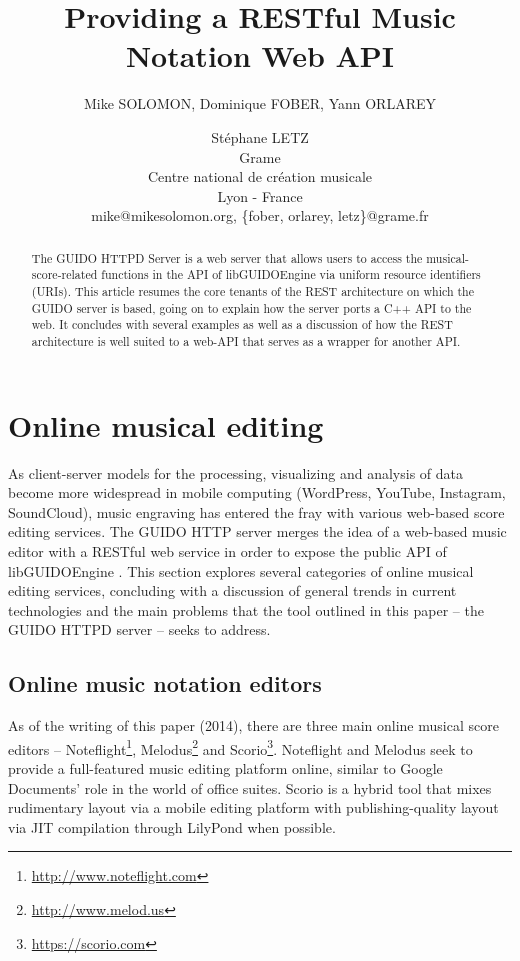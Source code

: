 \documentclass[11pt,a4paper]{article}
\title{Providing a RESTful Music Notation Web API}
\author
{Mike SOLOMON, Dominique FOBER, Yann ORLAREY \and Stéphane LETZ
\\ Grame
\\ Centre national de création musicale
\\ Lyon - France 
\\ mike@mikesolomon.org, \{fober, orlarey, letz\}@grame.fr 
}
\date{}
\newcommand{\footurl}[1]	{\footnote{\url{#1}}}
\begin{document}
\maketitle

\begin{abstract}

The GUIDO HTTPD Server is a web server that allows users to access the musical-score-related functions in the API of libGUIDOEngine via uniform resource identifiers (URIs).  This article resumes the core tenants of the REST architecture on which the GUIDO server is based, going on to explain how the server ports a C++ API to the web.  It concludes with several examples as well as a discussion of how the REST architecture is well suited to a web-API that serves as a wrapper for another API.
\end{abstract}


\section{Online musical editing}\label{section:online-musical-editing}
As client-server models for the processing, visualizing and analysis of data become more widespread in mobile computing (WordPress, YouTube, Instagram, SoundCloud), music engraving has entered the fray with various web-based score editing services.  The GUIDO HTTP server merges the idea of a web-based music editor with a RESTful web service in order to expose the public API of libGUIDOEngine \cite{guido}. This section explores several categories of online musical editing services, concluding with a discussion of general trends in current technologies and the main problems that the tool outlined in this paper -- the GUIDO HTTPD server -- seeks to address.
\subsection{Online music notation editors}\label{subsection:editor}
As of the writing of this paper (2014), there are three main online musical score editors -- Noteflight\footurl{http://www.noteflight.com}, Melodus\footurl{http://www.melod.us} and Scorio\footurl{https://scorio.com}.  Noteflight and Melodus seek to provide a full-featured music editing platform online, similar to Google Documents' role in the world of office suites.  Scorio is a hybrid tool that mixes rudimentary layout via a mobile editing platform with publishing-quality layout via JIT compilation through LilyPond when possible.
\end{document}
